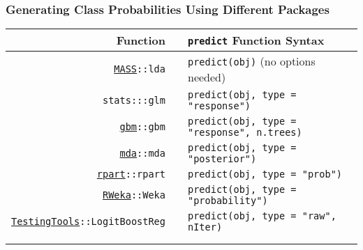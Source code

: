 \documentclass[12 pt]{beamer}\usepackage[]{graphicx}\usepackage[]{color}
\newcommand{\hlstr}[1]{\textcolor[rgb]{0.063,0.58,0.627}{#1}}%
\newcommand{\hlstd}[1]{\textcolor[rgb]{0.196,0.196,0.196}{#1}}%
\newcommand{\hlkwc}[1]{\textcolor[rgb]{0,0.631,0.314}{#1}}%
\newcommand{\hlkwd}[1]{\textcolor[rgb]{0.78,0.227,0.412}{#1}}%
\newcommand{\mxkwd}[1]{\texttt{\hlkwd{#1}}}%
\newcommand{\pkg}[1]{{\fontseries{b}\selectfont #1}}
\renewcommand{\pkg}[1]{{\color{darkgreen}\texttt{#1}}}
\begin{document}
  \begin{frame}[fragile]
\frametitle{Generating Class Probabilities Using Different Packages}

\begin{footnotesize}
\begin{center}
\begin{tabular}{rcl}
{\bf Function} && {\bf {\tt predict} Function Syntax} \\
\hline
 \href{http://cran.r-project.org/web/packages/MASS/index.html}{\pkg{MASS}}\texttt{::}\mxkwd{lda} && {\tt \hlkwd{predict}\hlstd{(obj)}} (no options needed)\\
\pkg{stats}\texttt{:::}\mxkwd{glm} && {\tt \hlkwd{predict}\hlstd{(obj,} \hlkwc{type} \hlstd{=} \hlstr{"response"}\hlstd{)}} \\
\href{http://cran.r-project.org/web/packages/gbm/index.html}{\pkg{gbm}}\texttt{::}\mxkwd{gbm} && {\tt \hlkwd{predict}\hlstd{(obj,} \hlkwc{type} \hlstd{=} \hlstr{"response"}\hlstd{, n.trees)}} \\
\href{http://cran.r-project.org/web/packages/mda/index.html}{\pkg{mda}}\texttt{::}\mxkwd{mda} && {\tt \hlkwd{predict}\hlstd{(obj,} \hlkwc{type} \hlstd{=} \hlstr{"posterior"}\hlstd{)}} \\
\href{http://cran.r-project.org/web/packages/rpart/index.html}{\pkg{rpart}}\texttt{::}\mxkwd{rpart} && {\tt \hlkwd{predict}\hlstd{(obj,} \hlkwc{type} \hlstd{=} \hlstr{"prob"}\hlstd{)}}   \\
\href{http://cran.r-project.org/web/packages/RWeka/index.html}{\pkg{RWeka}}\texttt{::}\mxkwd{Weka} && {\tt \hlkwd{predict}\hlstd{(obj,} \hlkwc{type} \hlstd{=} \hlstr{"probability"}\hlstd{)}}  \\
\href{http://cran.r-project.org/web/packages/TestingTools/index.html}{\pkg{TestingTools}}\texttt{::}\mxkwd{LogitBoostReg}  && {\tt \hlkwd{predict}\hlstd{(obj,} \hlkwc{type} \hlstd{=}  \hlstr{"raw"}\hlstd{, nIter)}} \\
\hline \\
\\
\end{tabular}
\end{center}
\end{footnotesize}
\end{frame}

\end{document}
